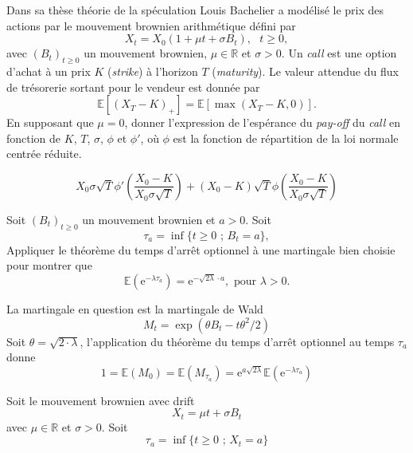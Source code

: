 \documentclass[11pts, answers]{exam}
\newcommand*{\RL}{\mathbb{R}}
\newcommand*{\E}{\mathbb{E}}
\newcommand*{\e}{\mathrm{e}}
\begin{document}
\begin{questions}
 \question Dans sa thèse théorie de la spéculation Louis Bachelier \cite{Bachelier1900} a modélisé le prix des actions par le mouvement brownien arithmétique défini par 
 $$
 X_t = X_0(1+\mu t+\sigma B_t),\text{ }t\geq 0,
 $$
 avec $(B_t)_{t\geq 0}$ un mouvement brownien, $\mu\in\RL$ et $\sigma>0$. Un \textit{call} est une option d'achat à un prix $K$ (\textit{strike}) à l'horizon $T$ (\textit{maturity}). Le valeur attendue du flux de trésorerie sortant pour le vendeur est donnée par 
 $$
\E[(X_T - K)_+]= \E[\max(X_T - K, 0)].
 $$
 En supposant que $\mu = 0$, donner l'expression de l'espérance du \textit{pay-off} du \textit{call} en fonction de $K$, $T$, $\sigma$, $\phi$ et $\phi'$, où $\phi$ est la fonction de répartition de la loi normale centrée réduite. 
 \begin{solution}
 $$
X_0\sigma\sqrt{T}\phi'\left(\frac{X_0 - K}{X_0\sigma\sqrt{T}}\right) + (X_0-K)\sqrt{T}\phi\left(\frac{X_0 - K}{X_0\sigma\sqrt{T}}\right)
 $$
 \end{solution}
\question Soit $(B_t)_{t\geq 0}$ un mouvement brownien et $a>0$. Soit 
$$
\tau_a = \inf\{t\geq 0\text{ ; }B_t = a\}, 
$$
Appliquer le théorème du temps d'arrêt optionnel à une martingale bien choisie pour montrer que 
$$
\E(\e^{-\lambda \tau_a}) = \e^{-\sqrt{2\lambda}\cdot a},\text{ pour }\lambda>0.
$$
\begin{solution}
La martingale en question est la martingale de Wald
$$
M_t = \exp(\theta B_t - t\theta^2/2)
$$
Soit $\theta = \sqrt{2\cdot \lambda}$, l'application du théorème du temps d'arrêt optionnel au temps $\tau_a$ donne 
$$
1 = \E(M_0) = \E(M_{\tau_a}) = \e^{a\sqrt{2\lambda}}\E(\e^{-\lambda \tau_a})
$$
\end{solution}
\question Soit le mouvement brownien avec drift 
$$
X_t = \mu t + \sigma B_t
$$
avec $\mu\in\RL$ et $\sigma>0$. Soit
$$
\tau_a = \inf\{t\geq 0\text{ ; }X_t = a\}
$$
\end{questions}
\end{document}
